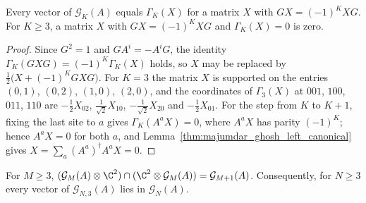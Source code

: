 \begin{lemma}%
    \label{lem:majumdar_ghosh_graded_injectivity}
    \leanok
    Every vector of $\mathcal G_{K}(A)$ equals $\Gamma_{K}(X)$ for a matrix $X$
    with $GX=(-1)^{K}XG$. For $K\ge3$, a matrix $X$ with $GX=(-1)^{K}XG$ and
    $\Gamma_{K}(X)=0$ is zero.
\end{lemma}

\begin{proof}
    \leanok
    Since $G^2=1$ and $GA^i=-A^iG$, the identity
    $\Gamma_{K}(GXG)=(-1)^{K}\Gamma_{K}(X)$ holds, so $X$ may be replaced by
    $\tfrac12\bigl(X+(-1)^{K}GXG\bigr)$. For $K=3$ the matrix $X$ is supported on
    the entries $(0,1)$, $(0,2)$, $(1,0)$, $(2,0)$, and the coordinates of
    $\Gamma_{3}(X)$ at $001$, $100$, $011$, $110$ are $-\tfrac12X_{02}$,
    $\tfrac1{\sqrt2}X_{10}$, $-\tfrac1{\sqrt2}X_{20}$ and $-\tfrac12X_{01}$. For the
    step from $K$ to $K+1$, fixing the last site to $a$ gives
    $\Gamma_{K}(A^aX)=0$, where $A^aX$ has parity $(-1)^{K}$; hence $A^aX=0$ for
    both $a$, and Lemma~\ref{thm:majumdar_ghosh_left_canonical} gives
    $X=\sum_a(A^a)^\dagger A^aX=0$.
\end{proof}

\begin{lemma}%
    \label{lem:majumdar_ghosh_intersection}
    \leanok
    For $M\ge3$,
    $(\mathcal G_{M}(A)\otimes\C^2)\cap(\C^2\otimes\mathcal G_{M}(A))
        =\mathcal G_{M+1}(A)$. Consequently, for $N\ge3$ every vector of
    $\mathcal G_{N,3}(A)$ lies in $\mathcal G_{N}(A)$.
\end{lemma}

